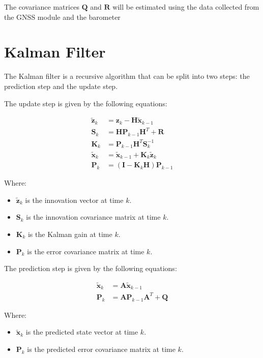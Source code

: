The covariance matrices $\mathbf{Q}$ and $\mathbf{R}$ will be estimated using the data collected from the GNSS module and the barometer

\section{Kalman Filter}
The Kalman filter is a recursive algorithm that can be split into two steps: the prediction step and the update step.

The update step is given by the following equations:

\begin{align}
    \mathbf{\tilde{z}}_k &= \mathbf{z}_k - \mathbf{H}\mathbf{\tilde{x}}_{k-1}\\
    \mathbf{S}_k &= \mathbf{H}\mathbf{P}_{k-1}\mathbf{H}^T + \mathbf{R}\\
    \mathbf{K}_k &= \mathbf{P}_{k-1}\mathbf{H}^T\mathbf{S}_k^{-1}\\
    \mathbf{\tilde{x}}_k &= \mathbf{\tilde{x}}_{k-1} + \mathbf{K}_k\mathbf{\tilde{z}}_k\\
    \mathbf{P}_k &= (\mathbf{I} - \mathbf{K}_k\mathbf{H})\mathbf{P}_{k-1}
\end{align}

Where:
\begin{itemize}
    \item $\mathbf{\tilde{z}}_k$ is the innovation vector at time $k$.
    \item $\mathbf{S}_k$ is the innovation covariance matrix at time $k$.
    \item $\mathbf{K}_k$ is the Kalman gain at time $k$.
    \item $\mathbf{P}_k$ is the error covariance matrix at time $k$.
\end{itemize}

The prediction step is given by the following equations:

\begin{align}
    \mathbf{\tilde{x}}_k &= \mathbf{A}\mathbf{\tilde{x}}_{k-1}\\
    \mathbf{P}_k &= \mathbf{A}\mathbf{P}_{k-1}\mathbf{A}^T + \mathbf{Q}
\end{align}

Where:
\begin{itemize}
    \item $\mathbf{\tilde{x}}_k$ is the predicted state vector at time $k$.
    \item $\mathbf{P}_k$ is the predicted error covariance matrix at time $k$.
\end{itemize}




